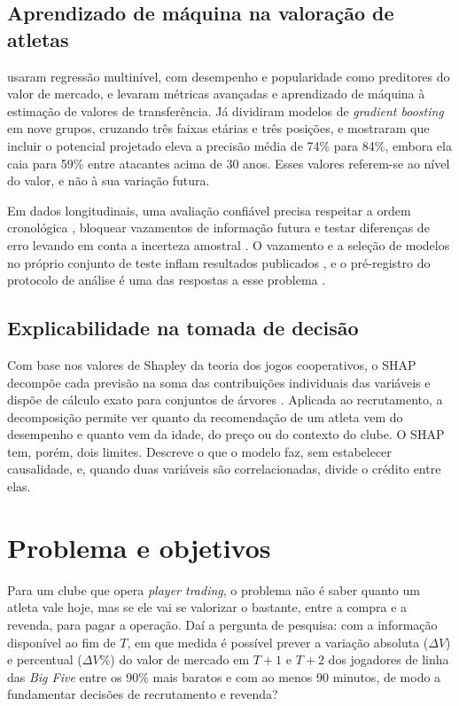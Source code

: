 \documentclass[article, 12pt, oneside, a4paper, english, brazil, section=TITLE]{abntex2}
\begin{document}
\subsection{Aprendizado de máquina na valoração de atletas}

\textcite{muller2017} usaram regressão multinível, com desempenho e popularidade como preditores do valor de mercado, e \textcite{mchale2023} levaram métricas avançadas e aprendizado de máquina à estimação de valores de transferência.
Já \textcite{khalife2025} dividiram modelos de \textit{gradient boosting} em nove grupos, cruzando três faixas etárias e três posições, e mostraram que incluir o potencial projetado eleva a precisão média de 74\% para 84\%, embora ela caia para 59\% entre atacantes acima de 30 anos.
Esses valores referem-se ao nível do valor, e não à sua variação futura.

Em dados longitudinais, uma avaliação confiável precisa respeitar a ordem cronológica \cite{bergmeir2018,cerqueira2020}, bloquear vazamentos de informação futura \cite{kaufman2011} e testar diferenças de erro levando em conta a incerteza amostral \cite{diebold1995,hansen2011}.
O vazamento e a seleção de modelos no próprio conjunto de teste inflam resultados publicados \cite{kapoor2023}, e o pré-registro do protocolo de análise é uma das respostas a esse problema \cite{nosek2018}.

\subsection{Explicabilidade na tomada de decisão}

Com base nos valores de Shapley da teoria dos jogos cooperativos, o SHAP decompõe cada previsão na soma das contribuições individuais das variáveis \cite{lundberg2017} e dispõe de cálculo exato para conjuntos de árvores \cite{lundberg2020}.
Aplicada ao recrutamento, a decomposição permite ver quanto da recomendação de um atleta vem do desempenho e quanto vem da idade, do preço ou do contexto do clube.
O SHAP tem, porém, dois limites.
Descreve o que o modelo faz, sem estabelecer causalidade, e, quando duas variáveis são correlacionadas, divide o crédito entre elas.

\section{Problema e objetivos}

Para um clube que opera \textit{player trading}, o problema não é saber quanto um atleta vale hoje, mas se ele vai se valorizar o bastante, entre a compra e a revenda, para pagar a operação.
Daí a pergunta de pesquisa: com a informação disponível ao fim de $T$, em que medida é possível prever a variação absoluta ($\Delta V$) e percentual ($\Delta V\%$) do valor de mercado em $T+1$ e $T+2$ dos jogadores de linha das \textit{Big Five} entre os 90\% mais baratos e com ao menos 90 minutos, de modo a fundamentar decisões de recrutamento e revenda?
\end{document}
